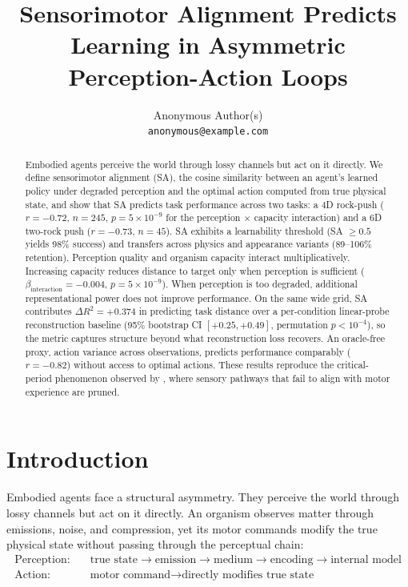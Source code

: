 \documentclass{article}
\title{Sensorimotor Alignment Predicts Learning in Asymmetric Perception-Action Loops}
\author{
  Anonymous Author(s) \\
  \texttt{anonymous@example.com}
}
\begin{document}
\maketitle

\begin{abstract}
Embodied agents perceive the world through lossy channels but act on it directly.
We define sensorimotor alignment (SA), the cosine similarity between an agent's
learned policy under degraded perception and the optimal action computed from true
physical state, and show that SA predicts task performance across two tasks: a 4D
rock-push ($r = -0.72$, $n = 245$, $p = 5 \times 10^{-9}$ for the perception
$\times$ capacity interaction) and a 6D two-rock push ($r = -0.73$, $n = 45$).
SA exhibits a learnability threshold (SA $\geq 0.5$ yields 98\% success) and
transfers across physics and appearance variants (89--106\% retention). Perception
quality and organism capacity interact multiplicatively. Increasing capacity
reduces distance to target only when perception is sufficient
($\beta_{\text{interaction}} = -0.004$, $p = 5 \times 10^{-9}$). When perception
is too degraded, additional representational power does not improve performance.
On the same wide grid, SA contributes $\Delta R^2 = +0.374$ in predicting task
distance over a per-condition linear-probe reconstruction baseline (95\%
bootstrap CI $[+0.25, +0.49]$, permutation $p < 10^{-4}$), so the metric
captures structure beyond what reconstruction loss recovers. An oracle-free
proxy, action variance across observations, predicts performance comparably
($r = -0.82$) without access to optimal actions. These results
reproduce the critical-period phenomenon observed by
\citet{blakemore1970development}, where sensory pathways that fail to align with
motor experience are pruned.
\end{abstract}

\section{Introduction}

Embodied agents face a structural asymmetry. They perceive the world through lossy
channels but act on it directly. An organism observes matter through emissions,
noise, and compression, yet its motor commands modify the true physical state
without passing through the perceptual chain:
%
\begin{align*}
\text{Perception:} &\quad \text{true state} \to \text{emission} \to \text{medium} \to \text{encoding} \to \text{internal model} \\
\text{Action:} &\quad \text{motor command} \to \text{directly modifies true state}
\end{align*}
\end{document}
